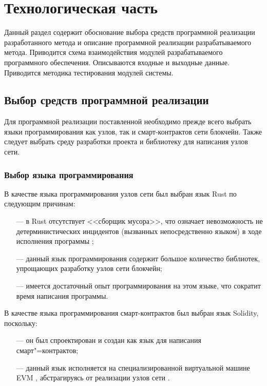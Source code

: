 \section{Технологическая часть}

Данный раздел содержит обоснование выбора средств программной реализации разработанного метода и описание программной реализации разрабатываемого метода. Приводится схема взаимодействия модулей разрабатываемого программного обеспечения. Описываются входные и выходные данные. Приводится методика тестирования модулей системы.



\subsection{Выбор средств программной реализации}

Для программной реализации поставленной необходимо прежде всего выбрать языки программирования как узлов, так и смарт-контрактов сети блокчейн. Также следует выбрать среду разработки проекта и библиотеку для написания узлов сети.


\subsubsection{Выбор языка программирования}

В качестве языка программирования узлов сети был выбран язык Rust по следующим причинам:
\begin{itemize}[leftmargin=1.6\parindent]
	\item[---] в Rust отсутствует <<сборщик мусора>>, что означает невозможность не детерминистических инцидентов (вызванных непосредственно языком) в ходе исполнения программы \cite{rust};
	\item[---] данный язык программирования содержит большое количество библиотек, упрощающих разработку узлов сети блокчейн;
	\item[---] имеется достаточный опыт программирования на этом языке, что сократит время написания программы.
\end{itemize}

В качестве языка программирования смарт-контрактов был выбран язык Solidity, поскольку:
\begin{itemize}[leftmargin=1.6\parindent]
	\item[---] он был спроектирован и создан как язык для написания смарт"=контрактов;
	\item[---] данный язык исполняется на специализированной виртуальной машине EVM \cite{evm}, абстрагируясь от реализации узлов сети \cite{solidity}.
\end{itemize}



